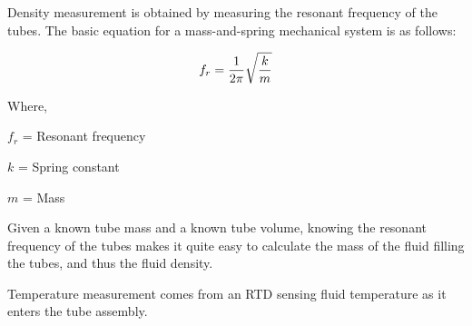 Density measurement is obtained by measuring the resonant frequency of the tubes.  The basic equation for a mass-and-spring mechanical system is as follows:

$$f_r = {1 \over 2 \pi} \sqrt{k \over m}$$

\noindent
Where,

$f_r$ = Resonant frequency

$k$ = Spring constant

$m$ = Mass 

\vskip 10pt

Given a known tube mass and a known tube volume, knowing the resonant frequency of the tubes makes it quite easy to calculate the mass of the fluid filling the tubes, and thus the fluid density.  

Temperature measurement comes from an RTD sensing fluid temperature as it enters the tube assembly.  











